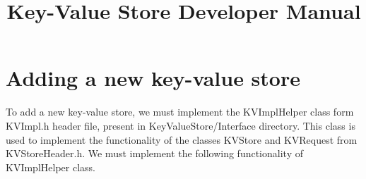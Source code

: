 \documentclass[11pt]{article}
\title{\textbf{Key-Value Store Developer Manual}}
\date{}
\begin{document}
\maketitle


\section{Adding a new key-value store}
To add a new key-value store, we must implement the KVImplHelper class form KVImpl.h header file, present in KeyValueStore/Interface directory. This class is used to implement the functionality of the classes KVStore and KVRequest from KVStoreHeader.h. We must implement the following functionality of KVImplHelper class.
\end{document}

